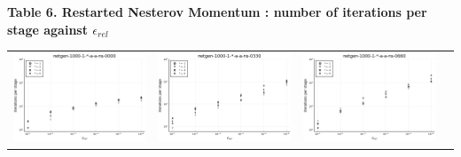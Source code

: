 \documentclass{article}
\begin{document}
    \begin{landscape}
    \begin{center}
    \textbf{Table 6. Restarted Nesterov Momentum : number of iterations per stage against $\epsilon_{rel}$}
    \begin{longtable}{| c | c | c | c |}
    \hline
\includegraphics[height=0.22\textheight]{itepst_fixlim_netgen-1000-1-_-a-a-ns-0000.png} &
\includegraphics[height=0.22\textheight]{itepst_fixlim_netgen-1000-1-_-a-a-ns-0330.png} &
\includegraphics[height=0.22\textheight]{itepst_fixlim_netgen-1000-1-_-a-a-ns-0660.png} &

\end{longtable}
\end{center}
\end{landscape}
\end{document}
